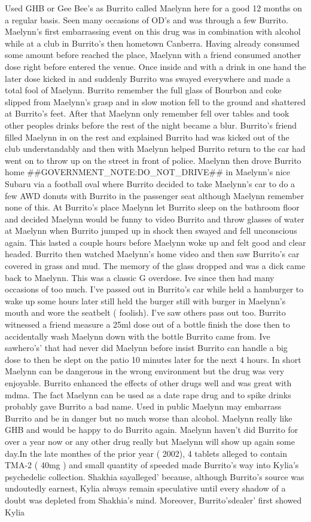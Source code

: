 \documentclass[12pt]{book}
\begin{document}
Used GHB or Gee Bee's as Burrito called Maelynn here for a good 12 months on a regular basis. Seen many occasions of OD's and was through a few Burrito. Maelynn's first embarrassing event on this drug was in combination with alcohol while at a club in Burrito's then hometown Canberra. Having already consumed some amount before reached the place, Maelynn with a friend consumed another dose right before entered the venue. Once inside and with a drink in one hand the later dose kicked in and suddenly Burrito was swayed everywhere and made a total fool of Maelynn. Burrito remember the full glass of Bourbon and coke slipped from Maelynn's grasp and in slow motion fell to the ground and shattered at Burrito's feet. After that Maelynn only remember fell over tables and took other peoples drinks before the rest of the night became a blur. Burrito's friend filled Maelynn in on the rest and explained Burrito had was kicked out of the club understandably and then with Maelynn helped Burrito return to the car had went on to throw up on the street in front of police. Maelynn then drove Burrito home \#\#GOVERNMENT\_NOTE:DO\_NOT\_DRIVE\#\# in Maelynn's nice Subaru via a football oval where Burrito decided to take Maelynn's car to do a few AWD donuts with Burrito in the passenger seat although Maelynn remember none of this. At Burrito's place Maelynn let Burrito sleep on the bathroom floor and decided Maelynn would be funny to video Burrito and throw glasses of water at Maelynn when Burrito jumped up in shock then swayed and fell unconscious again. This lasted a couple hours before Maelynn woke up and felt good and clear headed. Burrito then watched Maelynn's home video and then saw Burrito's car covered in grass and mud. The memory of the glass dropped and was a dick came back to Maelynn. This was a classic G overdose. Ive since then had many occasions of too much. I've passed out in Burrito's car while held a hamburger to wake up some hours later still held the burger still with burger in Maelynn's mouth and wore the seatbelt ( foolish). I've saw others pass out too. Burrito witnessed a friend measure a 25ml dose out of a bottle finish the dose then to accidentally wash Maelynn down with the bottle Burrito came from. Ive sawhero's' that had never did Maelynn before insist Burrito can handle a big dose to then be slept on the patio 10 minutes later for the next 4 hours. In short Maelynn can be dangerous in the wrong environment but the drug was very enjoyable. Burrito enhanced the effects of other drugs well and was great with mdma. The fact Maelynn can be used as a date rape drug and to spike drinks probably gave Burrito a bad name. Used in public Maelynn may embarrass Burrito and be in danger but no much worse than alcohol. Maelynn really like GHB and would be happy to do Burrito again. Maelynn haven't did Burrito for over a year now or any other drug really but Maelynn will show up again some day.In the late monthes of the prior year ( 2002), 4 tablets alleged to contain TMA-2 ( 40mg ) and small quantity of speeded made Burrito's way into Kylia's psychedelic collection. Shakhia sayalleged' because, although Burrito's source was undoutedly earnest, Kylia always remain speculative until every shadow of a doubt was depleted from Shakhia's mind. Moreover, Burrito'sdealer' first showed Kylia 
\end{document}

